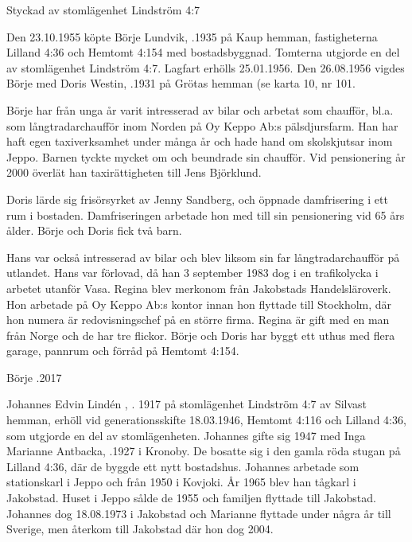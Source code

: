 



Styckad av stomlägenhet Lindström 4:7


Den 23.10.1955 köpte Börje Lundvik, .1935 på Kaup hemman, fastigheterna Lilland 4:36 och Hemtomt 4:154 med bostadsbyggnad. Tomterna utgjorde en del av stomlägenhet Lindström 4:7. Lagfart erhölls 25.01.1956. Den 26.08.1956 vigdes Börje med Doris Westin, .1931 på Grötas hemman (se karta 10, nr 101.

Börje har från unga år varit intresserad av bilar och arbetat som chaufför, bl.a. som långtradarchaufför inom Norden på Oy Keppo Ab:s pälsdjursfarm. Han har haft egen taxiverksamhet under många år och hade hand om skolskjutsar inom Jeppo. Barnen tyckte mycket om och beundrade sin chaufför. Vid pensionering år 2000 överlät han taxirättigheten till Jens Björklund.

Doris lärde sig frisörsyrket av Jenny Sandberg, och öppnade damfrisering i ett rum i bostaden. Damfriseringen arbetade hon med till sin pensionering vid 65 års ålder.  Börje och Doris fick två barn.
\begin{jhchildren}
  \item {}
  \item {}
\end{jhchildren}
Hans var också intresserad av bilar och blev liksom sin far långtradarchaufför på utlandet. Hans var förlovad, då han 3 september 1983 dog i en trafikolycka i arbetet utanför Vasa.  Regina blev merkonom från Jakobstads Handelsläroverk. Hon arbetade på Oy Keppo Ab:s kontor innan hon flyttade till Stockholm, där hon numera är redovisningschef på en större firma. Regina är gift med en man från Norge och de har tre flickor. Börje och Doris har byggt ett uthus med flera garage, pannrum och förråd på Hemtomt 4:154.

Börje .2017


Johannes Edvin Lindén , . 1917 på stomlägenhet Lindström 4:7 av Silvast hemman, erhöll vid generationsskifte 18.03.1946, Hemtomt 4:116 och Lilland 4:36, som utgjorde en del av stomlägenheten.  Johannes gifte sig 1947 med Inga Marianne Antbacka, .1927 i Kronoby. De bosatte sig i den gamla röda stugan på Lilland 4:36, där de byggde ett nytt bostadshus. Johannes arbetade som stationskarl i Jeppo och från 1950 i Kovjoki. År 1965 blev han tågkarl i Jakobstad. Huset i Jeppo sålde de 1955 och familjen flyttade till Jakobstad. Johannes dog 18.08.1973 i Jakobstad och Marianne flyttade under några år till Sverige, men återkom till Jakobstad där hon dog 2004.

